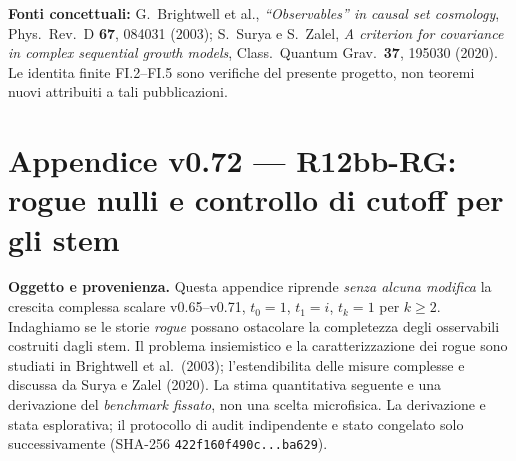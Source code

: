 \documentclass[11pt,a4paper]{article}
\begin{document}
\textbf{Fonti concettuali:} G.~Brightwell et al., \emph{``Observables'' in causal set cosmology}, Phys.~Rev.~D \textbf{67}, 084031 (2003); S.~Surya e S.~Zalel, \emph{A criterion for covariance in complex sequential growth models}, Class.~Quantum Grav.~\textbf{37}, 195030 (2020). Le identita finite FI.2--FI.5 sono verifiche del presente progetto, non teoremi nuovi attribuiti a tali pubblicazioni.


\clearpage
\section*{Appendice v0.72 --- R12bb-RG: rogue nulli e controllo di cutoff per gli stem}
\textbf{Oggetto e provenienza.} Questa appendice riprende \emph{senza alcuna modifica} la crescita complessa scalare v0.65--v0.71, $t_0=1$, $t_1=i$, $t_k=1$ per $k\ge2$. Indaghiamo se le storie \emph{rogue} possano ostacolare la completezza degli osservabili costruiti dagli stem. Il problema insiemistico e la caratterizzazione dei rogue sono studiati in Brightwell et al.~(2003); l'estendibilita delle misure complesse e discussa da Surya e Zalel (2020). La stima quantitativa seguente e una derivazione del \emph{benchmark fissato}, non una scelta microfisica. La derivazione e stata esplorativa; il protocollo di audit indipendente e stato congelato solo successivamente (SHA-256 \texttt{422f160f490c...ba629}).
\end{document}
